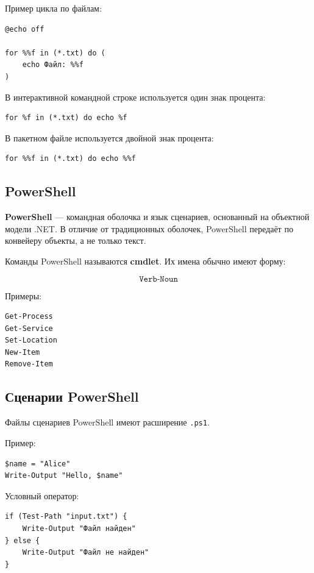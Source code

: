 \documentclass[12pt,a4paper]{article}
\begin{document}
Пример цикла по файлам:

\begin{lstlisting}
@echo off

for %%f in (*.txt) do (
    echo Файл: %%f
)
\end{lstlisting}

В интерактивной командной строке используется один знак процента:

\begin{lstlisting}
for %f in (*.txt) do echo %f
\end{lstlisting}

В пакетном файле используется двойной знак процента:

\begin{lstlisting}
for %%f in (*.txt) do echo %%f
\end{lstlisting}

\subsection{PowerShell}

\textbf{PowerShell} --- командная оболочка и язык сценариев, основанный на объектной модели .NET. В отличие от традиционных оболочек, PowerShell передаёт по конвейеру объекты, а не только текст.

Команды PowerShell называются \textbf{cmdlet}. Их имена обычно имеют форму:

\[
\texttt{Verb-Noun}
\]

Примеры:

\begin{lstlisting}
Get-Process
Get-Service
Set-Location
New-Item
Remove-Item
\end{lstlisting}

\subsection{Сценарии PowerShell}

Файлы сценариев PowerShell имеют расширение \texttt{.ps1}.

Пример:

\begin{lstlisting}
$name = "Alice"
Write-Output "Hello, $name"
\end{lstlisting}

Условный оператор:

\begin{lstlisting}
if (Test-Path "input.txt") {
    Write-Output "Файл найден"
} else {
    Write-Output "Файл не найден"
}
\end{lstlisting}
\end{document}
